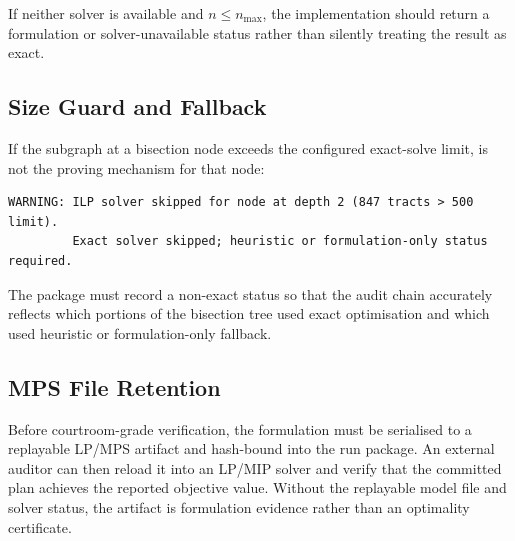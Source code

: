 If neither solver is available and $n \leq n_{\max}$, the implementation should
return a formulation or solver-unavailable status rather than silently treating
the result as exact.

\subsection{Size Guard and Fallback}

If the subgraph at a bisection node exceeds the configured exact-solve limit,
\ilp{} is not the proving mechanism for that node:

\begin{verbatim}
WARNING: ILP solver skipped for node at depth 2 (847 tracts > 500 limit).
         Exact solver skipped; heuristic or formulation-only status required.
\end{verbatim}

The package must record a non-exact status so that the audit chain accurately
reflects which portions of the bisection tree used exact optimisation and which
used heuristic or formulation-only fallback.

\subsection{MPS File Retention}

Before courtroom-grade verification, the formulation must be serialised to a
replayable LP/MPS artifact and hash-bound into the run package.  An external
auditor can then reload it into an LP/MIP solver and verify that the committed
plan achieves the reported objective value.  Without the replayable model file
and solver status, the artifact is formulation evidence rather than an
optimality certificate.
